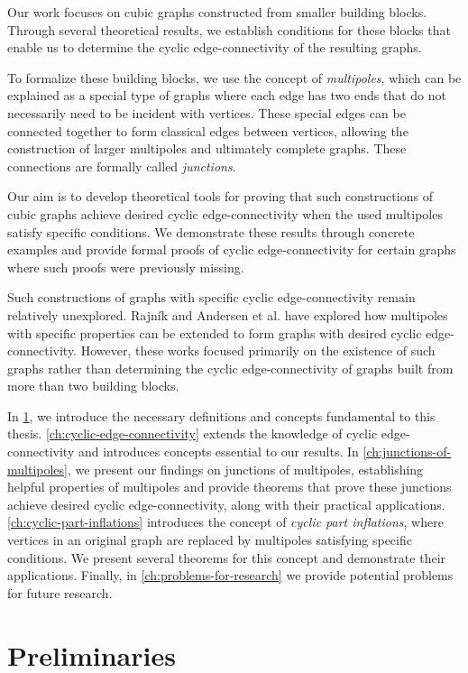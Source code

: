 \documentclass[12pt, twoside]{book}
\begin{document}
Our work focuses on cubic graphs constructed from smaller building blocks. Through several theoretical results, we establish conditions for these blocks that enable us to determine the cyclic \mbox{edge-connectivity} of the resulting graphs.

To formalize these building blocks, we use the concept of \textit{multipoles}, which can be explained as a special type of graphs where each edge has two ends that do not necessarily need to be incident with vertices. These special edges can be connected together to form classical edges between vertices, allowing the construction of larger multipoles and ultimately complete graphs. These connections are formally called \textit{junctions}.

Our aim is to develop theoretical tools for proving that such constructions of cubic graphs achieve desired cyclic edge-connectivity when the used multipoles satisfy specific conditions. We demonstrate these results through concrete examples and provide formal proofs of cyclic edge-connectivity for certain graphs where such proofs were previously missing.

Such constructions of graphs with specific cyclic edge-connectivity remain relatively unexplored. Rajník \cite{Rajnik_phd} and Andersen et al. \cite{Andersen1988} have explored how multipoles with specific properties can be extended to form graphs with desired cyclic edge-connectivity. However, these works focused primarily on the existence of such graphs rather than determining the cyclic edge-connectivity of graphs built from more than two building blocks.

In \cref{ch:preliminaries}, we introduce the necessary definitions and concepts fundamental to this thesis. \cref{ch:cyclic-edge-connectivity} extends the knowledge of cyclic edge-connectivity and introduces concepts essential to our results. In \cref{ch:junctions-of-multipoles}, we present our findings on junctions of multipoles, establishing helpful properties of multipoles and provide theorems that prove these junctions achieve desired cyclic edge-connectivity, along with their practical applications. \cref{ch:cyclic-part-inflations} introduces the concept of \textit{cyclic part inflations}, where vertices in an original graph are replaced by multipoles satisfying specific conditions. We present several theorems for this concept and demonstrate their applications. Finally, in \cref{ch:problems-for-research} we provide potential problems for future research.

\chapter{Preliminaries}\label{ch:preliminaries}
\end{document}
